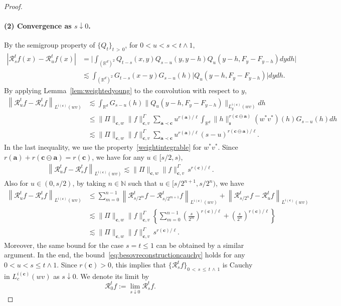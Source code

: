 \documentclass[AHL,Unicode,longabstracts,published]{cedram}
\newcommand{\bbR}{\mathbb{R}}
\newcommand{\bbN}{\mathbb{N}}
\newcommand{\mfs}{\mathfrak{s}}
\newcommand{\wco}{w^*}
\newcommand{\vco}{v^*}
\newcommand{\bfa}{\mathbf{a}}
\newcommand{\bfc}{\mathbf{c}}
\newcommand{\bfcoa}{\mathbf{c}\ominus\mathbf{a}}
\newcommand{\mcR}{\mathcal{R}}
\begin{document}
\begin{proof}
\paragraph*{(2) Convergence as $s\downarrow0$.}
By the semigroup property of $\{Q_t\}_{t\,>\,0}$, for $0<u<s<t\wedge1$,
\begin{align*}
\left|\mcR_s^tf(x)-\mcR_u^tf(x)\right| &=\bigg|\int_{(\bbR^d)^2}Q_{t-s}(x,y)Q_{s-u}(y,y-h)Q_u(y-h,F_y-F_{y-h})dydh\bigg|\\
&\lesssim\int_{(\bbR^d)^2}G_{t-s}(x-y)G_{s-u}(h)\big|Q_u(y-h,F_y-F_{y-h})\big|dydh.
\end{align*}
By applying Lemma~\ref{lem:weightedyoung} to the convolution with respect to $y$,
\begin{align*}
\left\|\mcR_u^tf-\mcR_s^tf\right\|_{L^{i(\bfc)}(wv)} &\lesssim\int_{\bbR^d}G_{s-u}(h)\big\|Q_u(y-h,F_{y}-F_{y-h})\big\|_{L_y^{i(\bfc)}(wv)}dh\\
&\le\|\Pi\|_{\bfc,w}\|f\|_{\bfc,v}^\Gamma\sum_{\bfa\prec\bfc}u^{r(\bfa)/\ell}\int_{\bbR^d}\|h\|_{\mfs}^{r(\bfcoa)}(\wco\vco)(h)G_{s-u}(h)dh\\
&\lesssim
\|\Pi\|_{\bfc,w}\|f\|_{\bfc,v}^\Gamma\sum_{\bfa\prec\bfc}u^{r(\bfa)/\ell}(s-u)^{r(\bfcoa)/\ell}.
\end{align*}
In the last inequality, we use the property~\eqref{weightintegrable} for $\wco\vco$. Since $r(\bfa)+r(\bfcoa)=r(\bfc)$, we have for any $u\in[s/2,s)$,
\begin{align}\label{eq:besovreconstructioncauchy}
\left\|\mcR_u^tf-\mcR_s^tf\right\|_{L^{i(\bfc)}(wv)}\lesssim\|\Pi\|_{\bfc,w}\|f\|_{\bfc,v}^\Gamma\, s^{r(\bfc)/\ell}.
\end{align}
Also for $u\in(0,s/2)$, by taking $n\in\bbN$ such that $u\in[s/2^{n+1},s/2^n)$, we have
\begin{align*}
\left\|\mcR_u^tf-\mcR_s^tf\right\|_{L^{i(\bfc)}(wv)} &\le\sum_{m=0}^{n-1}\left\|\mcR_{s/2^m}^tf-\mcR_{s/2^{m+1}}^tf\right\|_{L^{i(\bfc)}(wv)}+\left\|\mcR_{s/2^n}^tf-\mcR_u^tf\right\|_{L^{i(\bfc)}(wv)}\\
&\lesssim\|\Pi\|_{\bfc,w}\|f\|_{\bfc,v}^\Gamma\left
\{\sum_{m=0}^{n-1}\left(\frac{s}{2^m}\right)^{r(\bfc)/\ell}+\left(\frac{s}{2^n}\right)^{r(\bfc)/\ell}\right\}\\
&\lesssim\|\Pi\|_{\bfc,w}\|f\|_{\bfc,v}^\Gamma\, s^{r(\bfc)/\ell}.
\end{align*}
Moreover, the same bound for the case $s=t\le1$ can be obtained by a similar argument. In the end, the bound~\eqref{eq:besovreconstructioncauchy} holds for any $0<u<s\le t\wedge1$. Since $r(\bfc)>0$, this implies that $\{\mcR_s^tf\}_{0\,<\,s\,\le\,t\,\wedge\,1}$ is Cauchy in $L_c^{i(\bfc)}(wv)$ as $s\downarrow0$. We denote its limit by
\[
\mcR_0^tf:=\lim_{s\downarrow0}\mcR_s^tf.
\]


\end{proof}
\end{document}
